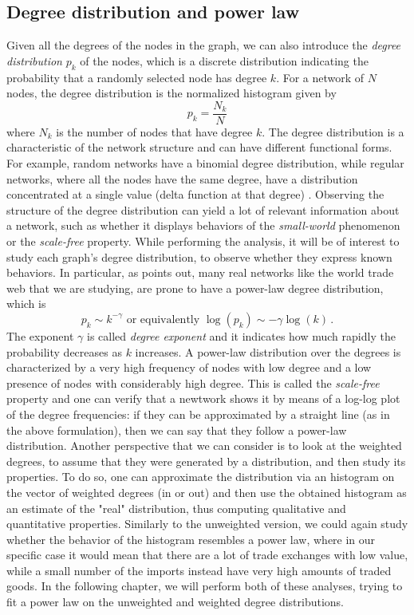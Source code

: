 \subsection{Degree distribution and power law}
Given all the degrees of the nodes in the graph, we can also introduce the \textit{degree distribution} $p_k$ of the nodes, which is a discrete distribution indicating the probability that a randomly selected node has degree $k$. For a network of $N$ nodes, the degree distribution is the normalized histogram given by 
\[ 
    p_k = \frac{N_k}{N} 
\]
where $N_k$ is the number of nodes that have degree $k$. 
The degree distribution is a characteristic of the network structure and can have different functional forms. For example, random networks have a binomial degree distribution, while regular networks, where all the nodes have the same degree, have a distribution concentrated at a single value (delta function at that degree) \cite{sajedianfard2021quantitative}. Observing the structure of the degree distribution can yield a lot of relevant information about a network, such as whether it displays behaviors of the \textit{small-world} phenomenon or the \textit{scale-free} property.
While performing the analysis, it will be of interest to study each graph's degree distribution, to observe whether they express known behaviors. In particular, as \textcite{barabasi2016network} points out, many real networks like the world trade web that we are studying, are prone to have a power-law degree distribution, which is
\[
    p_k \sim k^{-\gamma} \text{ or equivalently } \log(p_k) \sim -\gamma \log(k) \,.
\]
The exponent $\gamma$ is called \textit{degree exponent} and it indicates how much rapidly the probability decreases as $k$ increases. A power-law distribution over the degrees is characterized by a very high frequency of nodes with low degree and a low presence of nodes with considerably high degree. This is called the \textit{scale-free} property and one can verify that a newtwork shows it by means of a log-log plot of the degree frequencies: if they can be approximated by a straight line (as in the above formulation), then we can say that they follow a power-law distribution.
Another perspective that we can consider is to look at the weighted degrees, to assume that they were generated by a distribution, and then study its properties. To do so, one can approximate the distribution via an histogram on the vector of weighted degrees (in or out) and then use the obtained histogram as an estimate of the "real" distribution, thus computing qualitative and quantitative properties. Similarly to the unweighted version, we could again study whether the behavior of the histogram resembles a power law, where in our specific case it would mean that there are a lot of trade exchanges with low value, while a small number of the imports instead have very high amounts of traded goods. In the following chapter, we will perform both of these analyses, trying to fit a power law on the unweighted and weighted degree distributions.


